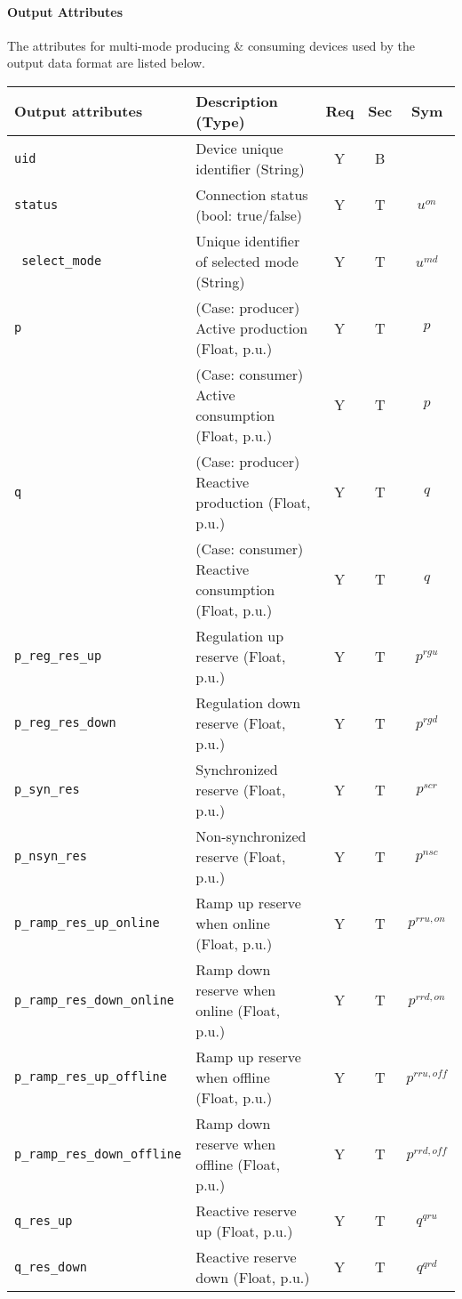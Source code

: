 \documentclass{article}
\begin{document}
\paragraph{Output Attributes} The attributes for multi-mode producing \& consuming devices
used by the output data format are listed below.
\begin{center}
\small
\begin{tabular}{ l | l | c | c | c |}
Output attributes & Description (Type) & Req & Sec & Sym\\
\hline
  {\tt uid} & Device unique identifier (String) & Y & B & \\
  {\tt status}     & Connection status (bool: true/false) & Y & T & $u^{on}$ \\
  {\tt\color{red} select\_mode}  & Unique identifier of selected mode (String)& Y & T & $u^{md}$\\
  {\tt p} & { (Case: producer) Active production (Float, p.u.) } & Y & T & $p$ \\
          & { (Case: consumer) Active consumption (Float, p.u.) } & Y & T & $p$ \\
  {\tt q} & { (Case: producer) Reactive production (Float, p.u.)}& Y & T & $q$ \\
          & { (Case: consumer) Reactive consumption (Float, p.u.)}& Y & T & $q$ \\
  {\tt p\_reg\_res\_up} & Regulation up reserve (Float, p.u.) & Y & T & $p^{rgu}$\\
  {\tt p\_reg\_res\_down} & Regulation down reserve (Float, p.u.) & Y & T & $p^{rgd}$\\
  {\tt p\_syn\_res} & Synchronized reserve (Float, p.u.) & Y & T &{ $p^{scr}$}\\
  {\tt p\_nsyn\_res} & Non-synchronized reserve (Float, p.u.) & Y & T &{ $p^{nsc}$}\\
  {\tt p\_ramp\_res\_up\_online}    & Ramp up reserve when online (Float, p.u.) & Y & T & $p^{rru, on}$\\
  {\tt p\_ramp\_res\_down\_online}  & Ramp down reserve when online (Float, p.u.) & Y & T & $p^{rrd, on}$\\
  {\tt p\_ramp\_res\_up\_offline}   & Ramp up reserve when offline (Float, p.u.) & Y & T & $p^{rru, off}$\\
  {\tt p\_ramp\_res\_down\_offline} & Ramp down reserve when offline (Float, p.u.) & Y & T & $p^{rrd, off}$\\
  {\tt q\_res\_up}   & Reactive reserve up (Float, p.u.) & Y & T & $q^{qru}$\\
  {\tt q\_res\_down} & Reactive reserve down (Float, p.u.) & Y & T & $q^{qrd}$\\
  \hline
\end{tabular}
\end{center}
\end{document}
